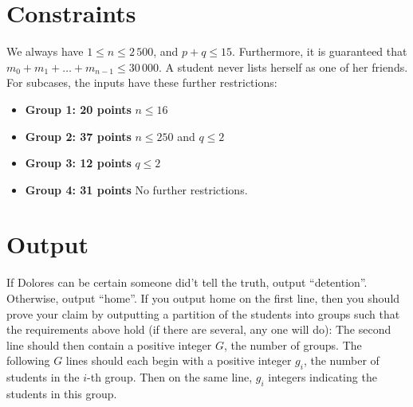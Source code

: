 \section*{Constraints}
We always have $1 \leq n \leq 2\,500$, and $p + q \leq 15$. Furthermore, it is guaranteed that $m_0 + m_1 + \ldots + m_{n-1} \leq 30\,000$. A student never lists herself as one of her friends. For subcases, the inputs have these further restrictions:

\begin{itemize}
    \item{\textbf{Group 1: 20 points}} $n \leq 16$
    \item{\textbf{Group 2: 37 points}} $n \leq 250$ and $q \leq 2$
    \item{\textbf{Group 3: 12 points}} $q \leq 2$
    \item{\textbf{Group 4: 31 points}} No further restrictions.
\end{itemize}

\section*{Output}
If Dolores can be certain someone did't tell the truth, output ``detention''. Otherwise, output ``home''. If you output home on the first line, then you should prove your claim by outputting a partition of the students into groups such that the requirements above hold (if there are several, any one will do): The second line should then contain a positive integer $G$, the number of groups. The following $G$ lines should each begin with a positive integer $g_i$, the number of students in the $i$-th group. Then on the same line, $g_i$ integers indicating the students in this group.

